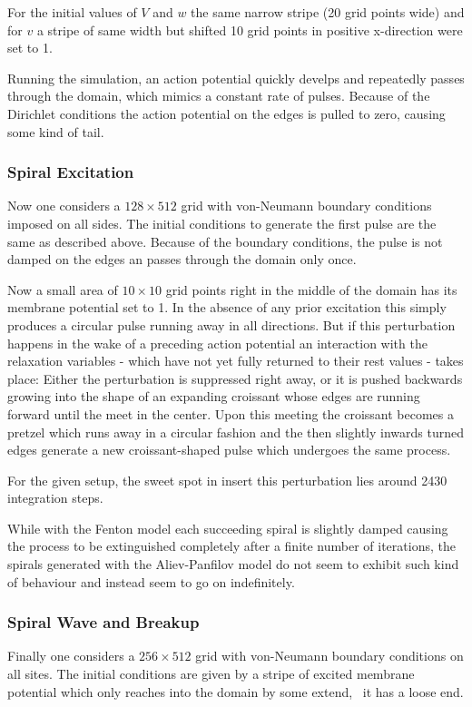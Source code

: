 For the initial values of $V$ and $w$ the same narrow stripe (20 grid points
wide) and for $v$ a stripe of same width but shifted 10 grid points in positive
x-direction were set to 1.

Running the simulation, an action potential quickly develps and repeatedly
passes through the domain, which mimics a constant rate of pulses. Because of
the Dirichlet conditions the action potential on the edges is pulled to zero,
causing some kind of tail.



\subsubsection{Spiral Excitation}
Now one considers a $128\times512$ grid with von-Neumann boundary conditions
imposed on all sides. The initial conditions to generate the first pulse are
the same as described above. Because of the boundary conditions, the pulse is
not damped on the edges an passes through the domain only once.

Now a small area of $10\times10$ grid points right in the middle of the domain
has its membrane potential set to 1. In the absence of any prior excitation
this simply produces a circular pulse running away in all directions. But if
this perturbation happens in the wake of a preceding action potential an
interaction with the relaxation variables - which have not yet fully returned
to their rest values - takes place: Either the perturbation is suppressed right
away, or it is pushed backwards growing into the shape of an expanding
croissant whose edges are running forward until the meet in the
center. Upon this meeting the croissant becomes a pretzel which runs away in a
circular fashion and the then slightly inwards turned edges generate a new
croissant-shaped pulse which undergoes the same process.


For the given setup, the sweet spot in insert this perturbation lies around
2430 integration steps.

While with the Fenton model each succeeding spiral is slightly damped causing
the process to be extinguished completely after a finite number of iterations,
the spirals generated with the Aliev-Panfilov model do not seem to exhibit such
kind of behaviour and instead seem to go on indefinitely.


\subsubsection{Spiral Wave and Breakup}
Finally one considers a $256\times512$ grid with von-Neumann boundary
conditions on all sites. The initial conditions are given by a stripe of
excited membrane potential which only reaches into the domain by some extend,
\ie~it has a loose end.

